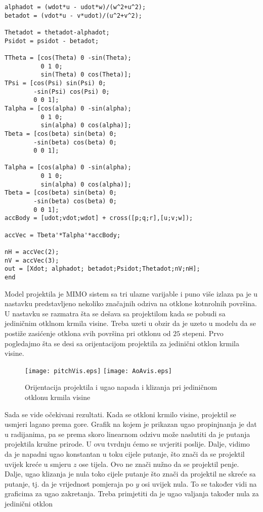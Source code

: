 \begin{lstlisting}
alphadot = (wdot*u - udot*w)/(w^2+u^2);
betadot = (vdot*u - v*udot)/(u^2+v^2);

Thetadot = thetadot-alphadot;
Psidot = psidot - betadot;

TTheta = [cos(Theta) 0 -sin(Theta);
          0 1 0;
          sin(Theta) 0 cos(Theta)];
TPsi = [cos(Psi) sin(Psi) 0;
        -sin(Psi) cos(Psi) 0;
        0 0 1];
Talpha = [cos(alpha) 0 -sin(alpha);
          0 1 0;
          sin(alpha) 0 cos(alpha)];
Tbeta = [cos(beta) sin(beta) 0;
        -sin(beta) cos(beta) 0;
        0 0 1];

Talpha = [cos(alpha) 0 -sin(alpha);
          0 1 0;
          sin(alpha) 0 cos(alpha)];
Tbeta = [cos(beta) sin(beta) 0;
        -sin(beta) cos(beta) 0;
        0 0 1];
accBody = [udot;vdot;wdot] + cross([p;q;r],[u;v;w]);

accVec = Tbeta'*Talpha'*accBody;

nH = accVec(2);
nV = accVec(3);
out = [Xdot; alphadot; betadot;Psidot;Thetadot;nV;nH];
end
    \end{lstlisting}
Model projektila je MIMO sistem sa tri ulazne varijable i puno više izlaza pa je u nastavku 
predstavljeno nekoliko značajnih odziva na otklone kotnrolnih površina. U nastavku se razmatra 
šta se dešava sa projektilom kada se pobudi sa jediničnim otklnom krmila visine. Treba uzeti u obzir 
da je uzeto u modelu da se postiže zasićenje otklona svih površina pri otklonu od $25$ stepeni.
Prvo pogledajmo šta se desi sa orijentacijom projektila za jedinični otklon krmila visine. 
\begin{figure}[!ht]
    \centering
    \texttt{[image: pitchVis.eps]}
    \texttt{[image: AoAvis.eps]}
    \caption{Orijentacija projektila i ugao napada i klizanja pri jediničnom otklonu krmila 
    visine}
\end{figure}
Sada se vide očekivani rezultati. Kada se otkloni krmilo visine, projektil se usmjeri lagano prema gore. 
Grafik na kojem je prikazan ugao propinjnanja je dat u radijanima, pa se prema skoro linearnom 
odzivu može naslutiti da je putanja projektila kružne prirode. U ovu tvrdnju ćemo se uvjeriti poslije. Dalje,
vidimo da je napadni ugao konstantan u toku cijele putanje, što znači da se projektil uvijek kreće u smjeru $z$ ose tijela.
Ovo ne znači nužno da se projektil penje. Dalje, ugao klizanja je nula toko cijele putanje što 
znači da projektil ne skreće sa putanje, tj. da je vrijednost pomjeraja po $y$ osi uvijek nula. To se također 
vidi na graficima za ugao zakretanja. Treba primjetiti da je ugao valjanja također nula za jedinični otklon 
